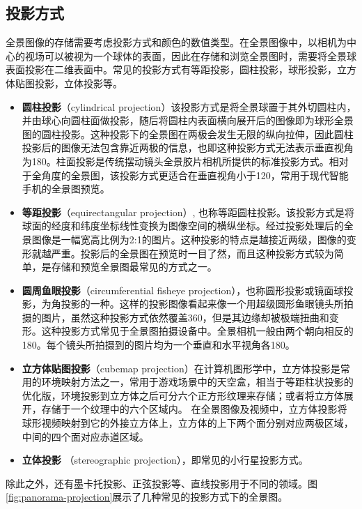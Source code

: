 \subsection{投影方式}
全景图像的存储需要考虑投影方式和颜色的数值类型。在全景图像中，以相机为中心的视场可以被视为一个球体的表面，因此在存储和浏览全景图时，需要将全景球表面投影在二维表面中。常见的投影方式有等距投影，圆柱投影，球形投影，立方体贴图投影，立体投影等。
\begin{itemize}
\item \textbf{圆柱投影}（cylindrical projection）该投影方式是将全景球置于其外切圆柱内，并由球心向圆柱面做投影，随后将圆柱内表面横向展开后的图像即为球形全景图的圆柱投影。这种投影下的全景图在两极会发生无限的纵向拉伸，因此圆柱投影后的图像无法包含靠近两极的信息，也即这种投影方式无法表示垂直视角为180。柱面投影是传统摆动镜头全景胶片相机所提供的标准投影方式。相对于全角度的全景图，该投影方式更适合在垂直视角小于120，常用于现代智能手机的全景图预览。
\item \textbf{等距投影}（equirectangular projection）, 也称等距圆柱投影。该投影方式是将球面的经度和纬度坐标线性变换为图像空间的横纵坐标。经过投影处理后的全景图像是一幅宽高比例为2:1的图片。这种投影的特点是越接近两级，图像的变形就越严重。投影后的全景图在预览时一目了然，而且这种投影方式较为简单，是存储和预览全景图最常见的方式之一。
\item \textbf{圆周鱼眼投影}（circumferential fisheye projection），也称圆形投影或镜面球投影，为角投影的一种。这样的投影图像看起来像一个用超级圆形鱼眼镜头所拍摄的图片，虽然这种投影方式依然覆盖360，但是其边缘却被极端扭曲和变形。这种投影方式常见于全景图拍摄设备中。全景相机一般由两个朝向相反的180。每个镜头所拍摄到的图片均为一个垂直和水平视角各180。
\item \textbf{立方体贴图投影}（cubemap projection）在计算机图形学中，立方体投影是常用的环境映射方法之一，常用于游戏场景中的天空盒，相当于等距柱状投影的优化版，环境投影到立方体之后可分六个正方形纹理来存储；或者将立方体展开，存储于一个纹理中的六个区域内。 
在全景图像及视频中，立方体投影将球形视频映射到它的外接立方体上，立方体的上下两个面分别对应两极区域，中间的四个面对应赤道区域。
\item \textbf{立体投影} （stereographic projection），即常见的小行星投影方式。
\end{itemize}

除此之外，还有墨卡托投影、正弦投影等、直线投影用于不同的领域。图\ref{fig:panorama-projection}展示了几种常见的投影方式下的全景图。


